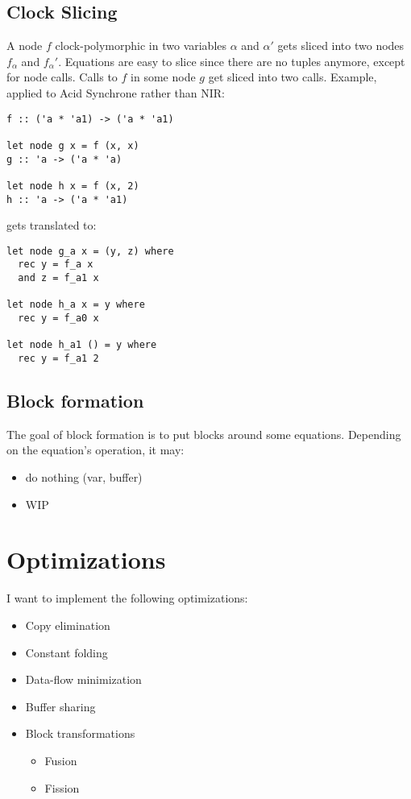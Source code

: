 \subsection{Clock Slicing}

A node $f$ clock-polymorphic in two variables $\alpha$ and $\alpha'$ gets sliced
into two nodes $f_\alpha$ and $f_\alpha'$. Equations are easy to slice since
there are no tuples anymore, except for node calls. Calls to $f$ in some node
$g$ get sliced into two calls. Example, applied to Acid Synchrone rather than
NIR:
\begin{verbatim}
f :: ('a * 'a1) -> ('a * 'a1)

let node g x = f (x, x)
g :: 'a -> ('a * 'a)

let node h x = f (x, 2)
h :: 'a -> ('a * 'a1)
\end{verbatim}
gets translated to:
\begin{verbatim}
let node g_a x = (y, z) where
  rec y = f_a x
  and z = f_a1 x

let node h_a x = y where
  rec y = f_a0 x

let node h_a1 () = y where
  rec y = f_a1 2
\end{verbatim}

\subsection{Block formation}

The goal of block formation is to put blocks around some equations. Depending on
the equation's operation, it may:
\begin{itemize}
\item do nothing (var, buffer)
\item WIP
\end{itemize}

\section{Optimizations}

I want to implement the following optimizations:
\begin{itemize}
\item Copy elimination
\item Constant folding
\item Data-flow minimization
\item Buffer sharing
\item Block transformations
  \begin{itemize}
  \item Fusion
  \item Fission
  \end{itemize}
\end{itemize}